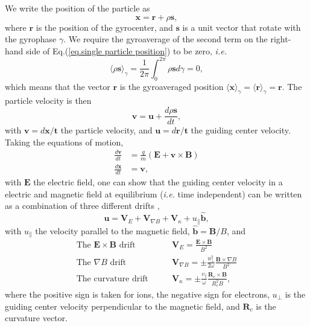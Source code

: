 \documentclass[my_thesis.tex]{subfiles}
\begin{document}
We write the position of the particle as
\begin{equation}
    \mathbf{x} = \mathbf{r} + \rho\mathbf{s},\label{eq.single particle position}
\end{equation}
where $\mathbf{r}$ is the position of the gyrocenter, and $\mathbf{s}$ is a unit vector that rotate with the gyrophase $\gamma$. We require the gyroaverage of the second term on the right-hand side of Eq.(\ref{eq.single particle position}) to be zero, \textit{i.e.}
\begin{equation}
    \langle \rho\mathbf{s}\rangle_\gamma = \frac{1}{2\pi}\int_0^{2\pi} \rho\mathbf{s}d\gamma = 0,
\end{equation}
which means that the vector $\mathbf{r}$ is the gyroaveraged position $\langle\mathbf{x}\rangle_\gamma = \langle\mathbf{r}\rangle_\gamma = \mathbf{r}$. The particle velocity is then
\begin{equation}
    \mathbf{v} = \mathbf{u} + \frac{d\rho\mathbf{s}}{dt},
\end{equation}
with $\mathbf{v}=d\mathbf{x}/\mathbf{t}$ the particle velocity, and $\mathbf{u}=d\mathbf{r}/\mathbf{t}$ the guiding center velocity. Taking the equations of motion,
\begin{align}
    \frac{d\mathbf{v}}{dt} &= \frac{q}{m}(\mathbf{E}+\mathbf{v}\times\mathbf{B})\\
    \frac{d\mathbf{x}}{dt} &= \mathbf{v},
\end{align}
with $\mathbf{E}$ the electric field, one can show that the guiding center velocity in a electric and magnetic field at equilibrium (\textit{i.e.} time independent) can be written as a combination of three different drifts \citep{freidberg_2007},
\begin{equation}
    \mathbf{u} = \mathbf{V}_E + \mathbf{V}_{\nabla B} + \mathbf{V}_\kappa + u_\parallel \hat{\mathbf{b}},
\end{equation}
with $u_\parallel$ the velocity parallel to the magnetic field, $\hat{\mathbf{b}}=\mathbf{B}/B$, and
\begin{align}
    \text{The $\mathbf{E}\times\mathbf{B}$ drift}\qquad &\mathbf{V}_E = \frac{\mathbf{E}\times\mathbf{B}}{B^2}\\
    \text{The $\nabla B$ drift}\qquad &\mathbf{V}_{\nabla B} = \pm \frac{u_\perp^2}{2\omega}\frac{\mathbf{B}\times\nabla B}{B^2}\\
    \text{The curvature drift}\qquad &\mathbf{V}_\kappa = \pm \frac{v_\parallel}{\omega}\frac{\mathbf{R}_c\times\mathbf{B}}{R_c^2 B},
\end{align}
where the positive sign is taken for ions, the negative sign for electrons, $u_\perp$ is the guiding center velocity perpendicular to the magnetic field, and $\mathbf{R}_c$ is the curvature vector.
\end{document}
